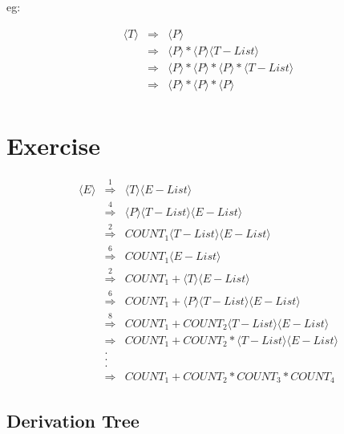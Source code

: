 \documentclass[a4paper,12pt]{article}
\begin{document}
eg:

\begin{eqnarray*}
\langle T \rangle	&	\Rightarrow	&	\langle P \rangle \\
						&	\Rightarrow	&	\langle P \rangle \ast \langle P \rangle \langle T-List \rangle \\
						& 	\Rightarrow	& 	\langle P \rangle \ast \langle P \rangle \ast \langle P \rangle \ast \langle T-List \rangle \\
						&	\Rightarrow	&	\langle P \rangle \ast \langle P \rangle \ast \langle P \rangle \\ 
\end{eqnarray*}

\section*{Exercise}

\begin{eqnarray*}
\langle E \rangle	&	\stackrel{1}{\Rightarrow}	&	\langle T \rangle \langle E-List \rangle \\
						&	\stackrel{4}{\Rightarrow}	&	\langle P \rangle \langle T-List \rangle \langle E-List \rangle \\
						&	\stackrel{2}{\Rightarrow}	&	COUNT_{1} \langle T-List \rangle \langle E-List \rangle \\
						&	\stackrel{6}{\Rightarrow}	&	COUNT_{1} \langle E-List \rangle \\
						&	\stackrel{2}{\Rightarrow}	&	COUNT_{1} + \langle T \rangle \langle E-List \rangle \\
						&	\stackrel{6}{\Rightarrow}	&	COUNT_{1} + \langle P \rangle \langle T-List \rangle \langle E-List \rangle \\
						&	\stackrel{8}{\Rightarrow}	&	COUNT_{1} + COUNT_{2} \langle T-List \rangle \langle E-List \rangle \\
						&	\stackrel{ }{\Rightarrow}	&	COUNT_{1} + COUNT_{2} \ast \langle T-List \rangle \langle E-List \rangle \\
						&	.	&	\\
						&	.	&	\\
						&	.	&	\\
						&	\stackrel{ }{\Rightarrow}	&	COUNT_{1} + COUNT_{2} \ast COUNT_{3} \ast COUNT_{4}
\end{eqnarray*}

\subsection*{Derivation Tree}

\end{document}
